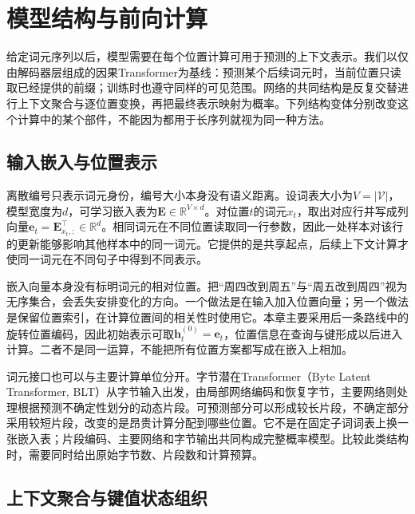 \section{模型结构与前向计算}
\label{sec:nlp-llm-computation}

给定词元序列以后，模型需要在每个位置计算可用于预测的上下文表示。我们以仅由解码器层组成的因果Transformer为基线：预测某个后续词元时，当前位置只读取已经提供的前缀；训练时也遵守同样的可见范围。网络的共同结构是反复交替进行上下文聚合与逐位置变换，再把最终表示映射为概率。下列结构变体分别改变这个计算中的某个部件，不能因为都用于长序列就视为同一种方法。

\subsection{输入嵌入与位置表示}
\label{sec:nlp-llm-embedding}

离散编号只表示词元身份，编号大小本身没有语义距离。设词表大小为$V=|\mathcal V|$，模型宽度为$d$，可学习嵌入表为$\bm{E}\in\mathbb R^{V\times d}$。对位置$t$的词元$x_t$，取出对应行并写成列向量$\bm e_t=\bm E_{x_t,:}^{\top}\in\mathbb R^d$。相同词元在不同位置读取同一行参数，因此一处样本对该行的更新能够影响其他样本中的同一词元。它提供的是共享起点，后续上下文计算才使同一词元在不同句子中得到不同表示。

嵌入向量本身没有标明词元的相对位置。把“周四改到周五”与“周五改到周四”视为无序集合，会丢失安排变化的方向。一个做法是在输入加入位置向量；另一个做法是保留位置索引，在计算位置间的相关性时使用它。本章主要采用后一条路线中的旋转位置编码，因此初始表示可取$\bm h_t^{(0)}=\bm e_t$，位置信息在查询与键形成以后进入计算。二者不是同一运算，不能把所有位置方案都写成在嵌入上相加。

词元接口也可以与主要计算单位分开。字节潜在Transformer（Byte Latent Transformer, BLT）从字节输入出发，由局部网络编码和恢复字节，主要网络则处理根据预测不确定性划分的动态片段。可预测部分可以形成较长片段，不确定部分采用较短片段，改变的是昂贵计算分配到哪些位置。它不是在固定子词词表上换一张嵌入表；片段编码、主要网络和字节输出共同构成完整概率模型。比较此类结构时，需要同时给出原始字节数、片段数和计算预算。

\subsection{上下文聚合与键值状态组织}
\label{sec:nlp-llm-attention}

